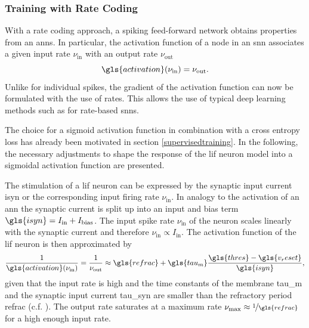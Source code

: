 \subsubsection*{Training with Rate Coding}
With a rate coding approach, a spiking feed-forward network obtains properties from an \glspl{ann}. In particular, the activation function of a node in an \gls{snn} associates a given input rate $\nu_{\text{in}}$ with an output rate $\nu_{\text{out}}$ 
\begin{equation*}
	\gls{activation}(\nu_{\text{in}}) = \nu_\text{out}.
\end{equation*}
Unlike for individual spikes, the gradient of the activation function can now be formulated with the use of rates.  This allows the use of typical deep learning methods such as  for rate-based \glspl{snn}.
 

The choice for a sigmoid activation function in combination with a cross entropy loss has already been motivated in section \cref{supervisedtraining}. In the following, the necessary adjustments to shape the response of the \gls{lif} neuron model into a sigmoidal activation function are presented.

The stimulation of a \gls{lif} neuron can be expressed by the synaptic input current \gls{isyn} or the corresponding input firing rate $\nu_\text{in}$. In analogy to the activation of an \gls{ann} the synaptic current is split up into an input and bias term $\gls{isyn} = I_\text{in} + I_\text{bias}$. The input spike rate $\nu_\text{in}$ of the neuron scales linearly with the synaptic current and therefore $\nu_\text{in} \propto I_\text{in}$. The activation function of the \gls{lif} neuron is then approximated by 
\begin{equation}
\frac{1}{\gls{activation}(\nu_\text{in})} = \frac{1}{\nu_\text{out}} \approx \gls{refrac} + \gls{tau_m} \frac{\gls{thres} - \gls{v_reset}}{\gls{isyn}},
\label{fireratehigh}
\end{equation}
given that the input rate is high and the time constants of the membrane \gls{tau_m} and the synaptic input current \gls{tau_syn} are smaller than the refractory period \gls{refrac} (c.f. \citealp{brunel2000dynamics}). The output rate saturates at a maximum rate $\nu_\text{max} \approx \nicefrac{1}{\gls{refrac}}$ for a high enough input rate.

